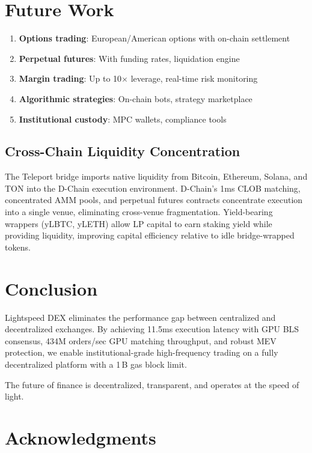 \documentclass[11pt,letterpaper]{article}
\begin{document}
\section{Future Work}

\begin{enumerate}
    \item \textbf{Options trading}: European/American options with on-chain settlement
    \item \textbf{Perpetual futures}: With funding rates, liquidation engine
    \item \textbf{Margin trading}: Up to 10$\times$ leverage, real-time risk monitoring
    \item \textbf{Algorithmic strategies}: On-chain bots, strategy marketplace
    \item \textbf{Institutional custody}: MPC wallets, compliance tools
\end{enumerate}

\subsection{Cross-Chain Liquidity Concentration}

The Teleport bridge imports native liquidity from Bitcoin, Ethereum, Solana, and TON into the D-Chain execution environment. D-Chain's 1ms CLOB matching, concentrated AMM pools, and perpetual futures contracts concentrate execution into a single venue, eliminating cross-venue fragmentation. Yield-bearing wrappers (yLBTC, yLETH) allow LP capital to earn staking yield while providing liquidity, improving capital efficiency relative to idle bridge-wrapped tokens.

\section{Conclusion}

Lightspeed DEX eliminates the performance gap between centralized and decentralized exchanges. By achieving 11.5ms execution latency with GPU BLS consensus, 434M orders/sec GPU matching throughput, and robust MEV protection, we enable institutional-grade high-frequency trading on a fully decentralized platform with a 1\,B gas block limit.

The future of finance is decentralized, transparent, and operates at the speed of light.

\section*{Acknowledgments}
\end{document}
